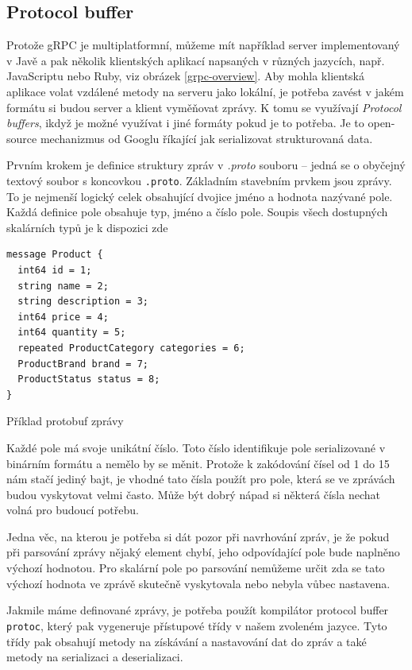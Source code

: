 \documentclass[thesis=M,czech]{FITthesis}[2019/12/23]
\begin{document}
\subsection{Protocol buffer}
Protože gRPC je multiplatformní, můžeme mít například server implementovaný v Javě a pak několik klientských aplikací napsaných v různých jazycích, např. JavaScriptu nebo Ruby, viz obrázek \ref{grpc-overview}. Aby mohla klientská aplikace volat vzdálené metody na serveru jako lokální, je potřeba zavést v jakém formátu si budou server a klient vyměňovat zprávy. K tomu se využívají \textit{Protocol buffers}, ikdyž je možné využívat i jiné formáty pokud je to potřeba. Je to open-source mechanizmus od Googlu říkající jak serializovat strukturovaná data.

Prvním krokem je definice struktury zpráv v \textit{.proto} souboru -- jedná se o obyčejný textový soubor s koncovkou \texttt{.proto}. Základním stavebním prvkem jsou zprávy. To je nejmenší logický celek obsahující dvojice jméno a hodnota nazývané pole. Každá definice pole obsahuje typ, jméno a číslo pole. Soupis všech dostupných skalárních typů je k dispozici zde \cite{proto_scalars}

\begin{listing}[H]
\begin{verbatim}
message Product {
  int64 id = 1;
  string name = 2;
  string description = 3;
  int64 price = 4;
  int64 quantity = 5;
  repeated ProductCategory categories = 6;
  ProductBrand brand = 7;
  ProductStatus status = 8;
}
\end{verbatim}
\caption{Příklad protobuf zprávy}
\label{lst:protobuf_example}
\end{listing}

Každé pole má svoje unikátní číslo. Toto číslo identifikuje pole serializované v binárním formátu a nemělo by se měnit. Protože k zakódování čísel od 1 do 15 nám stačí jediný bajt, je vhodné tato čísla použít pro pole, která se ve zprávách budou vyskytovat velmi často. Může být dobrý nápad si některá čísla nechat volná pro budoucí potřebu.

Jedna věc, na kterou je potřeba si dát pozor při navrhování zpráv, je že pokud při parsování zprávy nějaký element chybí, jeho odpovídající pole bude naplněno výchozí hodnotou. Pro skalární pole po parsování nemůžeme určit zda se tato výchozí hodnota ve zprávě skutečně vyskytovala nebo nebyla vůbec nastavena. 

Jakmile máme definované zprávy, je potřeba použít kompilátor protocol buffer \texttt{protoc}, který pak vygeneruje přístupové třídy v našem zvoleném jazyce. Tyto třídy pak obsahují metody na získávání a nastavování dat do zpráv a také metody na serializaci a deserializaci.
\end{document}
